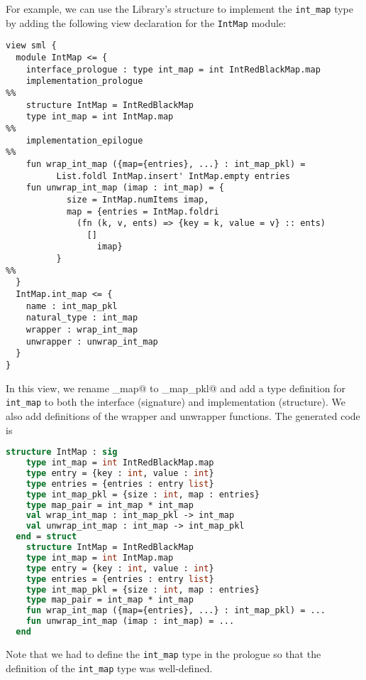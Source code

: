 For example, we can use the \smlnj{} Library's \lstinline@IntRedBlackMap@ structure
to implement the \lstinline!int_map! type by adding the following view declaration
for the \lstinline!IntMap! module:
%
\begin{code}\begin{lstlisting}[language=ASDL]
view sml {
  module IntMap <= {
    interface_prologue : type int_map = int IntRedBlackMap.map
    implementation_prologue
%%
    structure IntMap = IntRedBlackMap
    type int_map = int IntMap.map
%%
    implementation_epilogue
%%
    fun wrap_int_map ({map={entries}, ...} : int_map_pkl) =
          List.foldl IntMap.insert' IntMap.empty entries
    fun unwrap_int_map (imap : int_map) = {
            size = IntMap.numItems imap,
            map = {entries = IntMap.foldri
              (fn (k, v, ents) => {key = k, value = v} :: ents)
                []
                  imap}
          }
%%
  }
  IntMap.int_map <= {
    name : int_map_pkl
    natural_type : int_map
    wrapper : wrap_int_map
    unwrapper : unwrap_int_map
  }
}
\end{lstlisting}\end{code}%
%
In this view, we rename \lstinline@int_map@ to \lstinline@int_map_pkl@ and add a type
definition for \lstinline!int_map! to both the interface
(signature) and implementation (structure).
We also add definitions of the wrapper and unwrapper functions.
The generated code is
\begin{code}\begin{lstlisting}[language=SML]
structure IntMap : sig
    type int_map = int IntRedBlackMap.map
    type entry = {key : int, value : int}
    type entries = {entries : entry list}
    type int_map_pkl = {size : int, map : entries}
    type map_pair = int_map * int_map
    val wrap_int_map : int_map_pkl -> int_map
    val unwrap_int_map : int_map -> int_map_pkl
  end = struct
    structure IntMap = IntRedBlackMap
    type int_map = int IntMap.map
    type entry = {key : int, value : int}
    type entries = {entries : entry list}
    type int_map_pkl = {size : int, map : entries}
    type map_pair = int_map * int_map
    fun wrap_int_map ({map={entries}, ...} : int_map_pkl) = ...
    fun unwrap_int_map (imap : int_map) = ...
  end
\end{lstlisting}\end{code}%
Note that we had to define the \lstinline[language=SML]@int_map@ type in
the prologue so that the definition of the \lstinline[language=SML]@int_map@
type was well-defined.


